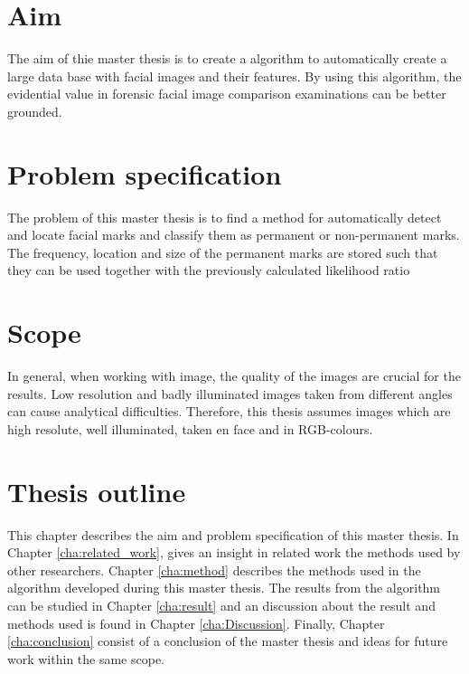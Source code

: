 \section{Aim}

The aim of thie master thesis is to create a algorithm to automatically create a large data base with facial images and their features. By using this algorithm, the evidential value in forensic facial image comparison examinations can be better grounded.

\section{Problem specification}

The problem of this master thesis is to find a method for automatically detect and locate facial marks and classify them as permanent or non-permanent marks. The frequency, location and size of the permanent marks are stored such that they can be used together with the previously calculated likelihood ratio

%
%



\section{Scope}

In general, when working with image, the quality of the images are crucial for the results. Low resolution and badly illuminated images taken from different angles can cause analytical difficulties. Therefore, this thesis assumes images which are high resolute, well illuminated, taken en face and in RGB-colours. 

\section{Thesis outline}

This chapter describes the aim and problem specification of this master thesis. In Chapter \ref{cha:related_work}, gives an insight in related work the methods used by other researchers. Chapter \ref{cha:method} describes the methods used in the algorithm developed during this master thesis. The results from the algorithm can be studied in Chapter \ref{cha:result} and an discussion about the result and methods used is found in Chapter \ref{cha:Discussion}. Finally, Chapter \ref{cha:conclusion} consist of a conclusion of the master thesis and ideas for future work within the same scope. 